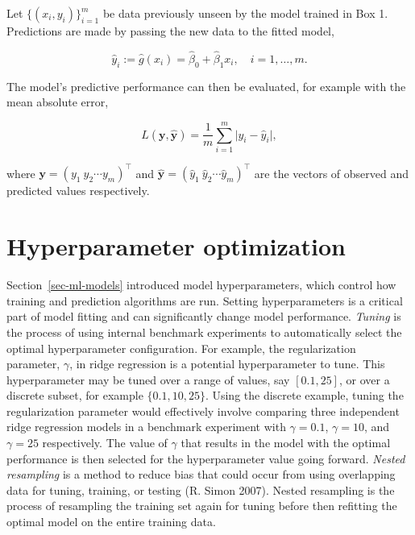 \documentclass[
  letterpaper,
  krantz2]{style/krantz}
\begin{document}
\begin{tcolorbox}[enhanced jigsaw, toprule=.15mm, bottomtitle=1mm, opacityback=0, breakable, leftrule=.75mm, title={Box 2 (Evaluating ridge regression)}, toptitle=1mm, bottomrule=.15mm, colback=white, colframe=quarto-callout-note-color-frame, titlerule=0mm, opacitybacktitle=0.6, coltitle=black, rightrule=.15mm, left=2mm, colbacktitle=quarto-callout-note-color!10!white, arc=.35mm]

Let \(\{(x_i, y_i)\}^m_{i=1}\) be data previously unseen by the model
trained in Box 1. Predictions are made by passing the new data to the
fitted model,

\[
\hat{y}_i := \hat{g}(x_i) = \hat{\beta}_0 + \hat{\beta}_1x_i, \quad i = 1,\ldots,m.
\]

The model's predictive performance can then be evaluated, for example
with the mean absolute error,

\[
L(\mathbf{y}, \hat{\mathbf{y}}) = \frac{1}{m} \sum^{m}_{i = 1} \vert y_i - \hat{y}_i \vert,
\]

where \(\boldsymbol{\mathbf{y}} = ({y}_1 \ {y}_2 \cdots {y}_{m})^\top\)
and
\(\boldsymbol{\mathbf{\hat{y}}} = ({\hat{y}}_1 \ {\hat{y}}_2 \cdots {\hat{y}}_{m})^\top\)
are the vectors of observed and predicted values respectively.

\end{tcolorbox}

\section{Hyperparameter optimization}\label{sec-ml-opt}

Section~\ref{sec-ml-models} introduced model
hyperparameters, which control how training and
prediction algorithms are run. Setting hyperparameters is a critical
part of model fitting and can significantly change model performance.
\emph{Tuning} is the process of using
internal benchmark experiments to automatically select the optimal
hyperparameter configuration. For example, the regularization parameter,
\(\gamma\), in ridge regression is a potential
hyperparameter to tune. This hyperparameter may be tuned over a range of
values, say \([0.1, 25]\), or over a discrete subset, for example
\(\{0.1, 10, 25\}\). Using the discrete example, tuning the
regularization parameter would effectively involve comparing three
independent ridge regression models in a benchmark experiment with
\(\gamma=0.1\), \(\gamma=10\), and \(\gamma=25\) respectively. The value
of \(\gamma\) that results in the model with the optimal performance is
then selected for the hyperparameter value going forward. \emph{Nested
resampling} is a method to reduce bias that
could occur from using overlapping data for tuning, training, or testing
(R. Simon 2007). Nested resampling is the process of resampling the
training set again for tuning before then refitting the optimal model on
the entire training data.
\end{document}
